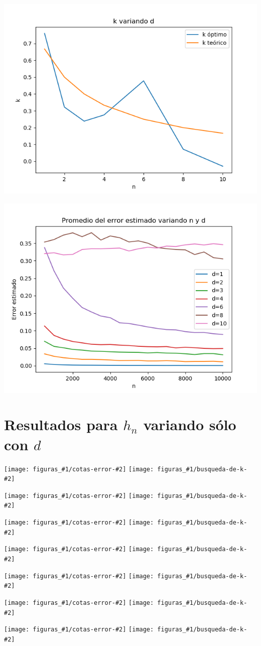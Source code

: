 \documentclass[12pt, a4paper]{article}
\newcommand{\imagenesDH}[2]{
  \texttt{[image: figuras\_\#1/cotas-error-\#2]}
  \texttt{[image: figuras\_\#1/busqueda-de-k-\#2]}
}
\begin{document}
\includegraphics[width=\textwidth]{figuras_h_dinamico/k-variando-d}

\includegraphics[width=\textwidth]{figuras_h_dinamico/resultados-grales}


\section{Resultados para $h_n$ variando sólo con $d$}

\imagenesDH{h_semidinamico}{d=1}
\imagenesDH{h_semidinamico}{d=2}
\imagenesDH{h_semidinamico}{d=3}
\imagenesDH{h_semidinamico}{d=4}
\imagenesDH{h_semidinamico}{d=6}
\imagenesDH{h_semidinamico}{d=8}
\imagenesDH{h_semidinamico}{d=10}
\end{document}
